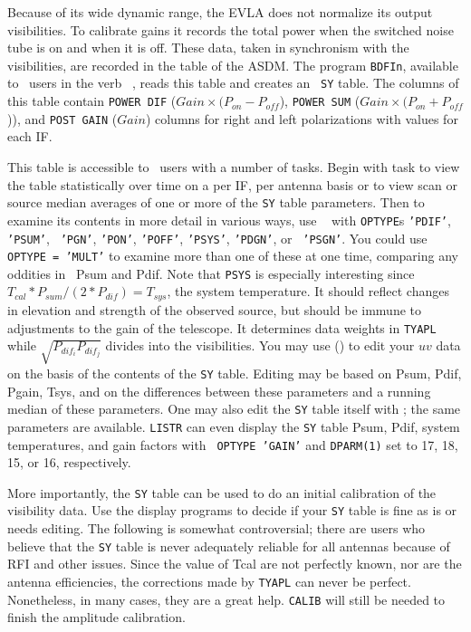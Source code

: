 
Because of its wide dynamic range, the EVLA does not normalize its
output visibilities.  To calibrate gains it records the total power
when the switched noise tube is on and when it is off.  These data,
taken in synchronism with the visibilities, are recorded in the
 table of the ASDM\@.  The {\tt {}} program
{\tt BDFIn}, available to \AIPS\ users in the verb {\tt
{}}, reads this table and creates an \AIPS\ {\tt SY}
table.  The columns of this table contain {\tt POWER DIF} ($Gain
\times (P_{on} - P_{off}$), {\tt POWER SUM} ($Gain \times (P_{on} +
P_{off}$)), and {\tt POST GAIN} ($Gain$) columns for right and left
polarizations with values for each IF\@.

This table is accessible to \AIPS\ users with a number of tasks.
Begin with task {\tt {}} to view the table statistically
over time on a per IF, per antenna basis or to view scan or source
median averages of one or more of the {\tt SY} table parameters.  Then
to examine its contents in more detail in various ways, use {\tt
{}} with {\tt OPTYPE}s {\tt 'PDIF'}, {\tt 'PSUM'}, {\tt
'PGN'}, {\tt 'PON'}, {\tt 'POFF'}, {\tt 'PSYS'}, {\tt 'PDGN'}, or {\tt
'PSGN'}\@.  You could use {\tt OPTYPE = 'MULT'} to examine more than
one of these at one time, comparing any oddities in \eg\ Psum and
Pdif.  Note that {\tt PSYS} is especially interesting since
$T_{cal}*P_{sum}/(2*P_{dif}) = T_{sys}$, the system temperature.  It
should reflect changes in elevation and strength of the observed
source, but should be immune to adjustments to the gain of the
telescope.  It determines data weights in {\tt TYAPL} while
$\sqrt{P_{dif_i} P_{dif_j}}$ divides into the visibilities.  You may
use {\tt {}} () to edit your $uv$ data on the
basis of the contents of the {\tt SY} table.  Editing may be based on
Psum, Pdif, Pgain, Tsys, and on the differences between these
parameters and a running median of these parameters.  One may also
edit the {\tt SY} table itself with {\tt {}}; the same
parameters are available.  {\tt LISTR} can even display the {\tt SY}
table Psum, Pdif,  system temperatures, and gain factors with {\tt
OPTYPE 'GAIN'} and {\tt DPARM(1)} set to 17, 18, 15, or 16,
respectively.

More importantly, the {\tt SY} table can be used to do an initial
calibration of the visibility data.  Use the display programs to
decide if your {\tt SY} table is fine as is or needs editing.  The
following is somewhat controversial; there are users who believe that
the {\tt SY} table is never adequately reliable for all antennas
because of RFI and other issues.  Since the value of Tcal are not
perfectly known, nor are the antenna efficiencies, the corrections
made by {\tt TYAPL} can never be perfect.  Nonetheless, in many cases,
they are a great help.  {\tt CALIB} will still be needed to finish the
amplitude calibration.

